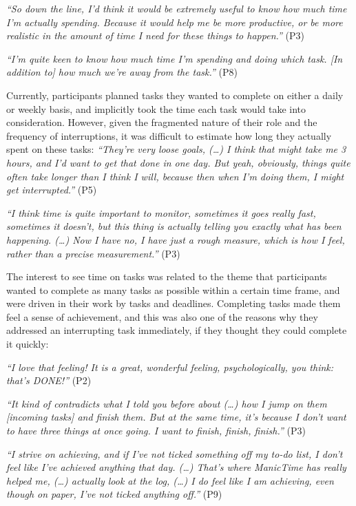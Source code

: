 \textit{“So down the line, I’d think it would be extremely useful to know how much time I’m actually spending. Because it would help me be more productive, or be more realistic in the amount of time I need for these things to happen.”} (P3)

\textit{“I'm quite keen to know how much time I'm spending and doing which task. [In addition to] how much we're away from the task.”} (P8) 

Currently, participants planned tasks they wanted to complete on either a daily or weekly basis, and implicitly took the time each task would take into consideration. However, given the fragmented nature of their role and the frequency of interruptions, it was difficult to estimate how long they actually spent on these tasks: 
\textit{“They’re very loose goals, (…) I think that might take me 3 hours, and I’d want to get that done in one day. But yeah, obviously, things quite often take longer than I think I will, because then when I’m doing them, I might get interrupted.”} (P5)

\textit{“I think time is quite important to monitor, sometimes it goes really fast, sometimes it doesn’t, but this thing is actually telling you exactly what has been happening. (…) Now I have no, I have just a rough measure, which is how I feel, rather than a precise measurement.”} (P3)

The interest to see time on tasks was related to the theme that participants wanted to complete as many tasks as possible within a certain time frame, and were driven in their work by tasks and deadlines. Completing tasks made them feel a sense of achievement, and this was also one of the reasons why they addressed an interrupting task immediately, if they thought they could complete it quickly:

\textit{“I love that feeling! It is a great, wonderful feeling, psychologically, you think: that’s DONE!”} (P2)

\textit{“It kind of contradicts what I told you before about (…) how I jump on them [incoming tasks] and finish them. But at the same time, it’s because I don’t want to have three things at once going. I want to finish, finish, finish.”} (P3)

\textit{“I strive on achieving, and if I’ve not ticked something off my to-do list, I don’t feel like I’ve achieved anything that day. (…) That’s where ManicTime has really helped me, (…) actually look at the log, (…) I do feel like I am achieving, even though on paper, I’ve not ticked anything off.”} (P9)

